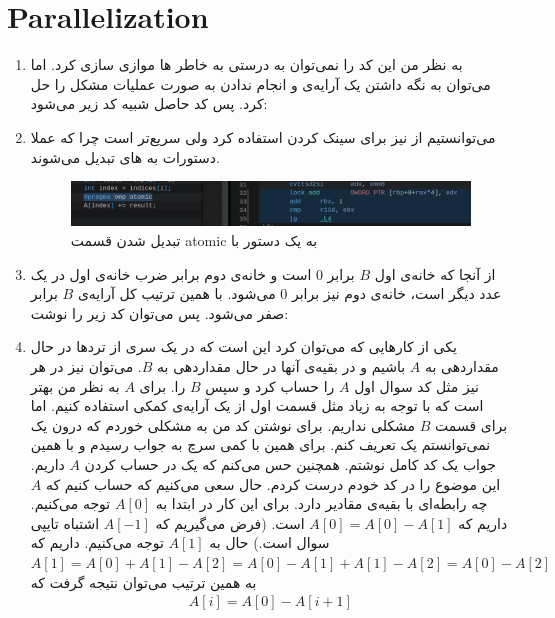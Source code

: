 \section{Parallelization}
\begin{enumerate}
    \item به نظر من این کد را نمی‌توان به درستی به خاطر
    ها
    موازی سازی کرد. اما می‌توان به نگه داشتن یک آرایه‌ی
    و انجام ندادن به صورت
    عملیات مشکل را حل کرد. پس کد حاصل شبیه کد زیر می‌شود:
    \item می‌توانستیم از
    نیز برای سینک کردن استفاده کرد ولی
    سریع‌تر است چرا که عملا دستورات
    به
    های
    تبدیل می‌شوند.
    \begin{figure}[H]
        \centering
        \includegraphics[scale=0.4]{pics/4-2.png}
        \caption{تبدیل شدن قسمت atomic به یک دستور با }
    \end{figure}
    \item از آنجا که خانه‌ی اول $B$ برابر 0 است و خانه‌ی دوم برابر ضرب خانه‌ی اول در یک عدد دیگر است،
    خانه‌ی دوم نیز برابر 0 می‌شود. با همین ترتیب کل آرایه‌ی $B$ برابر صفر می‌شود. پس می‌توان کد زیر را نوشت:
    \item یکی از کار‌هایی که می‌توان کرد این است که در یک سری از ترد‌ها در حال مقداردهی به
    $A$
    باشیم و در بقیه‌ی آنها در حال مقدار‌دهی به
    $B$. می‌توان نیز در هر
    نیز مثل کد سوال اول
    $A$
    را حساب کرد و سپس
    $B$
    را. برای
    $A$ به نظر من بهتر است که با توجه به
    زیاد مثل قسمت اول از یک آرایه‌ی کمکی استفاده کنیم. اما برای قسمت
    $B$
    مشکلی نداریم. برای نوشتن کد
    من به مشکلی خوردم که درون یک
    نمی‌توانستم یک
    تعریف کنم. برای همین با کمی سرچ به
    جواب رسیدم و با همین جواب یک کد کامل
    نوشتم. همچنین حس می‌کنم که یک
    در حساب کردن
    $A$
    داریم. این موضوع را در کد خودم درست کردم.
    حال سعی می‌کنیم که حساب کنیم که
    $A$
    چه رابطه‌ای با بقیه‌ی مقادیر دارد. برای این کار در ابتدا به
    $A[0]$
    توجه می‌کنیم. داریم که
    $A[0] = A[0] - A[1]$
    است. (فرض می‌گیریم که $A[-1]$ اشتباه تایپی سوال است.)
    حال به
    $A[1]$
    توجه می‌کنیم. داریم که
    $A[1] = A[0] + A[1] - A[2] = A[0] - A[1] + A[1] - A[2] = A[0] - A[2]$
    به همین ترتیب می‌توان نتیجه گرفت که
    \begin{gather*}
        A[i] = A[0] - A[i+1]
    \end{gather*}
\end{enumerate}